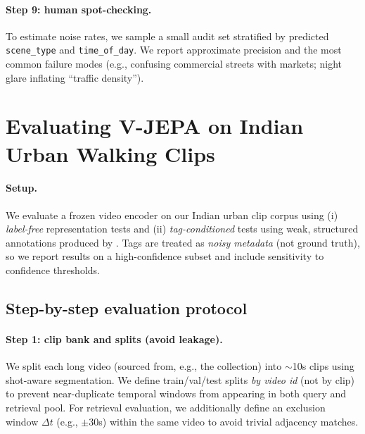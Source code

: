 \paragraph{Step 9: human spot-checking.} To estimate noise rates, we sample a small audit set stratified by predicted \texttt{scene\_type} and \texttt{time\_of\_day}. We report approximate precision and the most common failure modes (e.g., confusing commercial streets with markets; night glare inflating ``traffic density'').


















\section{Evaluating V-JEPA on Indian Urban Walking Clips}\label{sec:vjepa_eval}
\paragraph{Setup.} We evaluate a frozen video encoder on our Indian urban clip corpus using (i) \emph{label-free} representation tests and (ii) \emph{tag-conditioned} tests using weak, structured annotations produced by . Tags are treated as \emph{noisy metadata} (not ground truth), so we report results on a high-confidence subset and include sensitivity to confidence thresholds.

\subsection{Step-by-step evaluation protocol}\label{sec:vjepa_eval_steps}

\paragraph{Step 1: clip bank and splits (avoid leakage).}
We split each long video (sourced from, e.g., the collection) into $\sim$10s clips using shot-aware segmentation. We define train/val/test splits \emph{by video id} (not by clip) to prevent near-duplicate temporal windows from appearing in both query and retrieval pool. For retrieval evaluation, we additionally define an exclusion window $\Delta t$ (e.g., $\pm 30$s) within the same video to avoid trivial adjacency matches.

